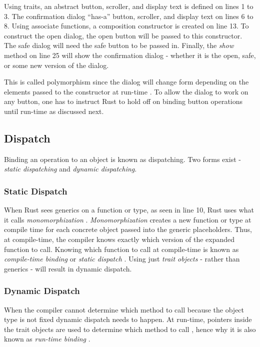 
Using traits, an abstract button, scroller, and display text is defined on lines 1 to 3.
The confirmation dialog ``has-a'' \cite{malik_09_01} button, scroller, and display text on lines 6 to 8.
Using associate functions\footnotemark[\ref{associate}], a composition constructor is created on line 13.
To construct the open dialog, the open button will be passed to this constructor.
The safe dialog will need the safe button to be passed in.
Finally, the \textit{show} method on line 25 will show the confirmation dialog - whether it is the open, safe, or some new version of the dialog.

This is called polymorphism since the dialog will change form depending on the elements passed to the constructor at run-time \cite{savitch_15_01,malik_09_01,gamma_94_01}.
To allow the dialog to work on any button, one has to instruct Rust to hold off on binding button operations until run-time as discussed next.

\subsection{Dispatch}
Binding an operation to an object is known as dispatching.
Two forms exist - \textit{static dispatching} and \textit{dynamic dispatching}.

\subsubsection{Static Dispatch}
When Rust sees generics on a function or type, as seen in  line 10, Rust uses what it calls \textit{monomorphization} \cite{klabnik_2019_01}.
\textit{Monomorphization} creates a new function or type at compile time for each concrete object passed into the generic placeholders.
Thus, at compile-time, the compiler knows exactly which version of the expanded function to call.
Knowing which function to call at compile-time is known as \textit{compile-time binding} \cite{malik_09_01} or \textit{static dispatch} \cite{klabnik_2019_01, alexandrescu_01_01}.
Using just \textit{trait objects} - rather than generics - will result in dynamic dispatch.

\subsubsection{Dynamic Dispatch}
When the compiler cannot determine which method to call because the object type is not fixed dynamic dispatch \cite{alexandrescu_01_01, klabnik_2019_01} needs to happen.
At run-time, pointers inside the trait objects are used to determine which method to call \cite{klabnik_2019_01}, hence why it is also known as \textit{run-time binding} \cite{malik_09_01}.

